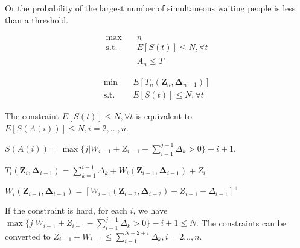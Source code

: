 \documentclass{article}
\newcommand{\Z}{\mathbf{Z}}
\newcommand{\D}{\bm{\Delta}}
\begin{document}
Or the probability of the largest number of simultaneous waiting people is less than a threshold.

\begin{equation}\label{stochastic_model}
    \begin{aligned}
        \max \quad & n \\
        \mbox{s.t.} \quad & E[S(t)] \leq N, \forall t \\
        & A_{n} \leq \overline{T}
    \end{aligned}
\end{equation}

\begin{equation}\label{stochastic}
    \begin{aligned}
        \min \quad & E \left[T_n(\Z_{n}, \D_{n-1}) \right] \\
        \mbox{s.t.} \quad & E\left[S(t) \right] \leq N, \forall t
    \end{aligned}
\end{equation}

The constraint $E\left[S(t) \right] \leq N, \forall t$ is equivalent to $E\left[S(A(i)) \right] \leq N, i=2,\ldots, n$.

$S(A(i)) = \max\{j|W_{i-1} + Z_{i-1}-\sum_{i-1}^{j-1} \Delta_{k} >0\} - i + 1$.


$T_{i}(\Z_{i}, \D_{i-1}) = \sum_{k=1}^{i-1} \Delta_{k} + W_{i}(\Z_{i-1}, \D_{i-1}) + Z_{i}$


$W_{i}(\Z_{i-1}, \D_{i-1}) = [W_{i-1}(\Z_{i-2}, \D_{i-2}) + Z_{i-1} - \Delta_{i-1}]^{+}$


If the constraint is hard, for each $i$, we have $\max\{j|W_{i-1} + Z_{i-1}-\sum_{i-1}^{j-1} \Delta_{k} >0\} - i + 1 \leq N$. The constraints can be converted to $Z_{i-1} + W_{i-1} \leq \sum_{i-1}^{N-2+i} \Delta_{k}, i =2 \ldots, n$.





\end{document}
